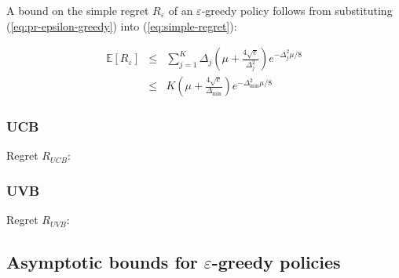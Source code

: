 \documentclass{article}
\newcommand {\IE} {\ensuremath {\mathbb{E}}}
\begin{document}
A bound on the simple regret $R_\varepsilon$ of an
$\varepsilon$-greedy policy follows from substituting
(\ref{eq:pr-epsilon-greedy}) into (\ref{eq:simple-regret}):

\begin{eqnarray}
\IE[R_\varepsilon]&\le&\sum_{j=1}^K\Delta_j\left(\mu + \frac {4\sqrt e}
{\Delta_j^2}\right)e^{-\Delta_j^2\mu/8}\nonumber\\
&\le&K\left(\mu + \frac {4\sqrt e}{\Delta_{\min}}\right)e^{-\Delta_{\min}^2\mu/8}
\end{eqnarray}

\subsubsection{UCB}

Regret $R_{UCB}$:

\subsubsection{UVB}

Regret $R_{UVB}$:

\subsection{Asymptotic bounds for $\varepsilon$-greedy policies}
\end{document}
